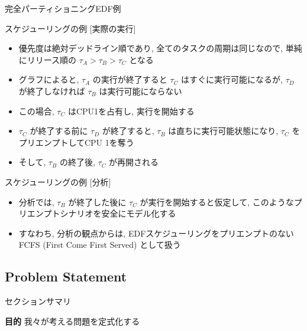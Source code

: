 \begin{frame}{完全パーティショニングEDF例}
\end{frame}

\begin{frame}{スケジューリングの例 [実際の実行]}
    \begin{itemize}
        \item 優先度は絶対デッドライン順であり, 全てのタスクの周期は同じなので, 単純にリリース順の $\tau_{A} > \tau_{B} > \tau_{C}$ となる
        \item グラフによると, $\tau_{A}$ の実行が終了すると $\tau_{C}$ はすぐに実行可能になるが, $\tau_{D}$ が終了しなければ $\tau_{B}$ は実行可能にならない
        \item この場合, $\tau_{C}$ はCPU1を占有し, 実行を開始する
        \item $\tau_{C}$ が終了する前に $\tau_{D}$ が終了すると, $\tau_{B}$ は直ちに実行可能状態になり, $\tau_{C}$ をプリエンプトしてCPU 1を奪う
        \item そして, $\tau_{B}$ の終了後, $\tau_{C}$ が再開される
    \end{itemize}
\end{frame}

\begin{frame}{スケジューリングの例 [分析]}
    \begin{itemize}
        \item 分析では, $\tau_{B}$ が終了した後に $\tau_{C}$ が実行を開始すると仮定して, このようなプリエンプトシナリオを安全にモデル化する
        \item すなわち, 分析の観点からは, EDFスケジューリングをプリエンプトのないFCFS (First Come First Served) として扱う
    \end{itemize}
\end{frame}


\subsection{Problem Statement}
\label{ssec: problem statement}

\begin{frame}{セクションサマリ}
    \begin{itembox}[l]{\textbf{目的}}
        我々が考える問題を定式化する
    \end{itembox}
\end{frame}

